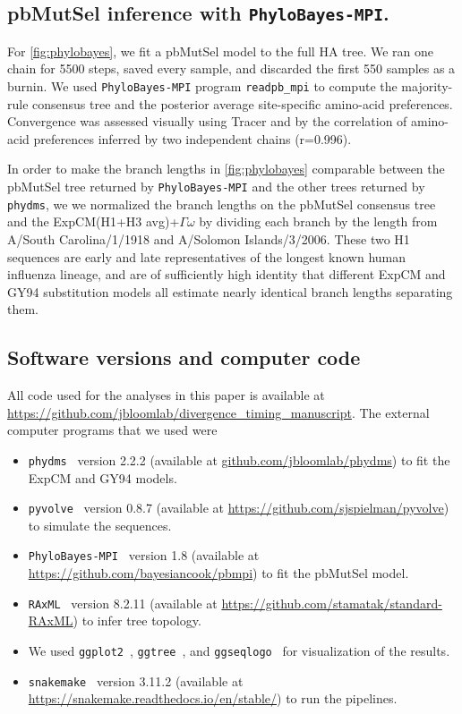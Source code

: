 \documentclass[11pt]{article}
\begin{document}
\subsection*{pbMutSel inference with \texttt{PhyloBayes-MPI}.}
For \ref{fig:phylobayes}, we fit a pbMutSel model to the full HA tree. 
We ran one chain for 5500 steps, saved every sample, and discarded the first 550 samples as a burnin. 
We used \texttt{PhyloBayes-MPI} program \texttt{readpb\_mpi} to compute the majority-rule consensus tree and the posterior average site-specific amino-acid preferences. 
Convergence was assessed visually using Tracer \citep{rambaut2018posterior} and by the correlation of amino-acid preferences inferred by two independent chains (r=0.996). 

In order to make the branch lengths in \ref{fig:phylobayes} comparable between the pbMutSel tree returned by \texttt{PhyloBayes-MPI} and the other trees returned by \texttt{phydms}, we we normalized the branch lengths on the pbMutSel consensus tree and the ExpCM(H1+H3 avg)+$\Gamma\omega$ by dividing each branch by the length from A/South Carolina/1/1918 and A/Solomon Islands/3/2006. 
These two H1 sequences are early and late representatives of the longest known human influenza lineage, and are of sufficiently high identity that different ExpCM and GY94 substitution models all estimate nearly identical branch lengths separating them. 

\subsection*{Software versions and computer code}
 All code used for the analyses in this paper is available at \url{https://github.com/jbloomlab/divergence_timing_manuscript}.
The external computer programs that we used were
\begin{itemize} 
\item \texttt{phydms}~\citep{hilton2017phydms} version 2.2.2 (available at \url{github.com/jbloomlab/phydms}) to fit the ExpCM and GY94 models.
\item \texttt{pyvolve}~\citep{spielman2015pyvolve} version 0.8.7 (available at \url{https://github.com/sjspielman/pyvolve}) to simulate the sequences.
\item \texttt{PhyloBayes-MPI}~\citep{rodrigue2014site} version 1.8 (available at \url{https://github.com/bayesiancook/pbmpi}) to fit the pbMutSel model. 
\item \texttt{RAxML}~\citep{stamatakis2006raxml} version 8.2.11 (available at \url{https://github.com/stamatak/standard-RAxML}) to infer tree topology.
\item We used \texttt{ggplot2}~\citep{wickham2016ggplot2}, \texttt{ggtree}~\citep{yu2017ggtree}, and \texttt{ggseqlogo}~\citep{wagih2017ggseqlogo} for visualization of the results.
\item \texttt{snakemake}~\citep{koster2012snakemake} version 3.11.2 (available at \url{https://snakemake.readthedocs.io/en/stable/}) to run the pipelines.
\end{itemize}
\end{document}
